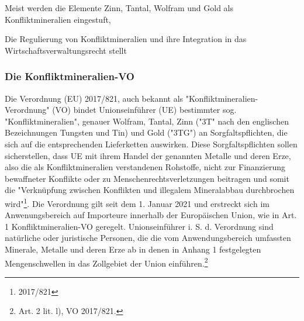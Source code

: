\documentclass[12pt,a4paper,oneside]{book} %
\begin{document}
	Meist werden die Elemente Zinn, Tantal, Wolfram und Gold als Konfliktmineralien eingestuft, 
	
	Die Regulierung von Konfliktmineralien und ihre Integration in das Wirtschaftsverwaltungsrecht stellt 
	
	\subsubsection{Die Konfliktmineralien-VO}
	Die Verordnung (EU) 2017/821, auch bekannt als "Konfliktmineralien-Verordnung" (VO) bindet Unionseinführer (UE) bestimmter sog. "Konfliktmineralien", genauer Wolfram, Tantal, Zinn ("3T" nach den englischen Bezeichnungen Tungsten und Tin) und Gold ("3TG") an Sorgfaltspflichten, die sich auf die entsprechenden Lieferketten auswirken. Diese Sorgfaltspflichten sollen sicherstellen, dass UE mit ihrem Handel der genannten Metalle und deren Erze, also die als Konfliktmineralien verstandenen Rohstoffe, nicht zur Finanzierung bewaffneter Konflikte oder zu Menschenrechtsverletzungen beitragen und somit die "Verknüpfung zwischen Konflikten und illegalem Mineralabbau durchbrochen wird"\footnote{2017/821}. Die Verordnung gilt seit dem 1. Januar 2021 und erstreckt sich im Anwenungsbereich auf Importeure innerhalb der Europäischen Union, wie in Art. 1 Konfliktmineralien-VO geregelt. Unionseinführer i. S. d. Verordnung sind natürliche oder juristische Personen, die die vom Anwendungsbereich umfassten Minerale, Metalle und deren Erze ab in denen in Anhang 1 festgelegten Mengenschwellen in das Zollgebiet der Union einführen.\footnote{Art. 2 lit. l), VO 2017/821.} 
	
\end{document}

